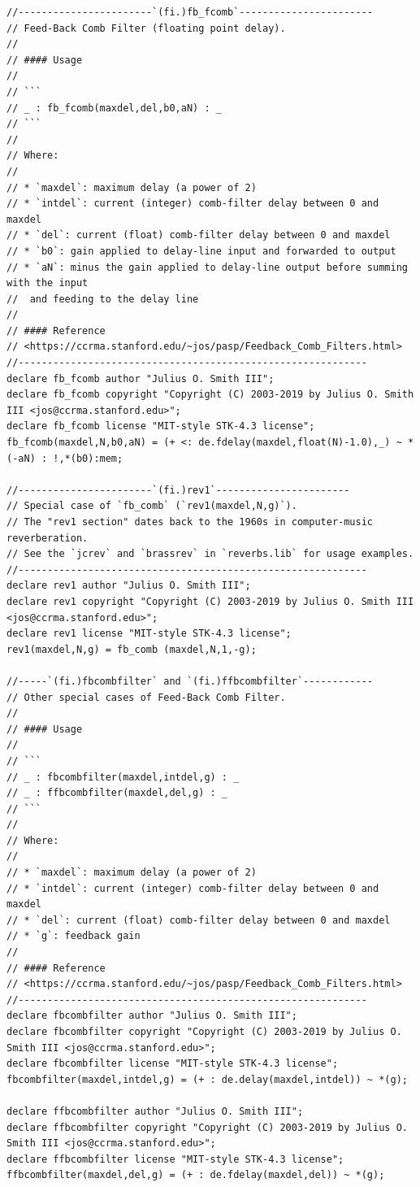 \documentclass{article}
\begin{document}
\begin{lstlisting}[caption=\texttt{filters.lib}]
//-----------------------`(fi.)fb_fcomb`-----------------------
// Feed-Back Comb Filter (floating point delay).
//
// #### Usage
//
// ```
// _ : fb_fcomb(maxdel,del,b0,aN) : _
// ```
//
// Where:
//
// * `maxdel`: maximum delay (a power of 2)
// * `intdel`: current (integer) comb-filter delay between 0 and maxdel
// * `del`: current (float) comb-filter delay between 0 and maxdel
// * `b0`: gain applied to delay-line input and forwarded to output
// * `aN`: minus the gain applied to delay-line output before summing with the input
// 	and feeding to the delay line
//
// #### Reference
// <https://ccrma.stanford.edu/~jos/pasp/Feedback_Comb_Filters.html>
//------------------------------------------------------------
declare fb_fcomb author "Julius O. Smith III";
declare fb_fcomb copyright "Copyright (C) 2003-2019 by Julius O. Smith III <jos@ccrma.stanford.edu>";
declare fb_fcomb license "MIT-style STK-4.3 license";
fb_fcomb(maxdel,N,b0,aN) = (+ <: de.fdelay(maxdel,float(N)-1.0),_) ~ *(-aN) : !,*(b0):mem;

//-----------------------`(fi.)rev1`-----------------------
// Special case of `fb_comb` (`rev1(maxdel,N,g)`).
// The "rev1 section" dates back to the 1960s in computer-music reverberation.
// See the `jcrev` and `brassrev` in `reverbs.lib` for usage examples.
//------------------------------------------------------------
declare rev1 author "Julius O. Smith III";
declare rev1 copyright "Copyright (C) 2003-2019 by Julius O. Smith III <jos@ccrma.stanford.edu>";
declare rev1 license "MIT-style STK-4.3 license";
rev1(maxdel,N,g) = fb_comb (maxdel,N,1,-g);

//-----`(fi.)fbcombfilter` and `(fi.)ffbcombfilter`------------
// Other special cases of Feed-Back Comb Filter.
//
// #### Usage
//
// ```
// _ : fbcombfilter(maxdel,intdel,g) : _
// _ : ffbcombfilter(maxdel,del,g) : _
// ```
//
// Where:
//
// * `maxdel`: maximum delay (a power of 2)
// * `intdel`: current (integer) comb-filter delay between 0 and maxdel
// * `del`: current (float) comb-filter delay between 0 and maxdel
// * `g`: feedback gain
//
// #### Reference
// <https://ccrma.stanford.edu/~jos/pasp/Feedback_Comb_Filters.html>
//------------------------------------------------------------
declare fbcombfilter author "Julius O. Smith III";
declare fbcombfilter copyright "Copyright (C) 2003-2019 by Julius O. Smith III <jos@ccrma.stanford.edu>";
declare fbcombfilter license "MIT-style STK-4.3 license";
fbcombfilter(maxdel,intdel,g) = (+ : de.delay(maxdel,intdel)) ~ *(g);

declare ffbcombfilter author "Julius O. Smith III";
declare ffbcombfilter copyright "Copyright (C) 2003-2019 by Julius O. Smith III <jos@ccrma.stanford.edu>";
declare ffbcombfilter license "MIT-style STK-4.3 license";
ffbcombfilter(maxdel,del,g) = (+ : de.fdelay(maxdel,del)) ~ *(g);



\end{lstlisting}
\end{document}

